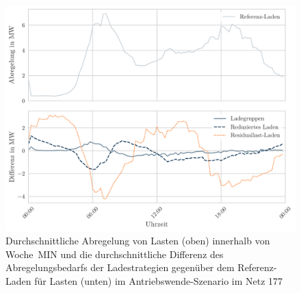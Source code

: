 \begin{figure}[H]
    \centering
    \includegraphics[width=\textwidth]{Bilder/177_load_diff}
    \caption{Durchschnittliche Abregelung von Lasten (oben) innerhalb von Woche~MIN und die durchschnittliche Differenz des Abregelungsbedarfs der Ladestrategien gegenüber dem Referenz-Laden für Lasten (unten) im Antriebswende-Szenario im Netz \num{177}}\label{fig:177_load_diff}
\end{figure}